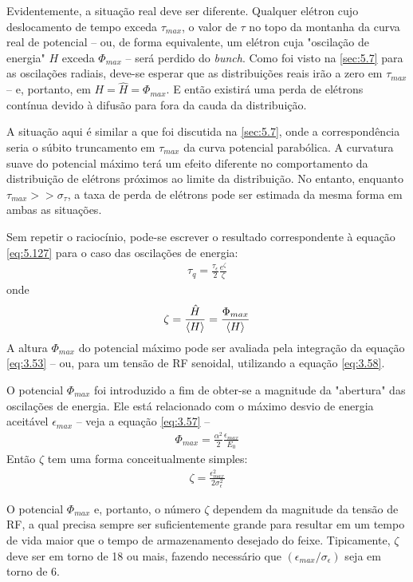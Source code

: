 Evidentemente, a situação real deve ser diferente. Qualquer elétron cujo deslocamento de tempo exceda $\tau_{max}$, o valor de $\tau$ no topo da montanha da curva real de potencial -- ou, de forma equivalente, um elétron cuja "oscilação de energia" $H$ exceda $\Phi_{max}$ -- será perdido do \textit{bunch}. Como foi visto na \autoref{sec:5.7} para as oscilações radiais, deve-se esperar que as distribuições reais irão a zero em $\tau_{max}$ -- e, portanto, em $H = \hat{H} = \Phi_{max}$. E então existirá uma perda de elétrons contínua devido à difusão para fora da cauda da distribuição.

A situação aqui é similar a que foi discutida na \autoref{sec:5.7}, onde a correspondência seria o súbito truncamento em $\tau_{max}$ da curva potencial parabólica. A curvatura suave do potencial máximo terá um efeito diferente no comportamento da distribuição de elétrons próximos ao limite da distribuição. No entanto, enquanto $\tau_{max} >> \sigma_\tau$, a taxa de perda de elétrons pode ser estimada da mesma forma em ambas as situações.

Sem repetir o raciocínio, pode-se escrever o resultado correspondente à equação \eqref{eq:5.127} para o caso das oscilações de energia:
\begin{align}
	\tau_q = \frac{\tau_\epsilon}{2}\frac{e^{\zeta}}{\zeta}
\end{align}
onde
\begin{align}
	\zeta = \frac{\hat{H}}{\left< H \right>} = \frac{\Phi_{max}}{\left< H \right>}
\end{align}
A altura $\Phi_{max}$ do potencial máximo pode ser avaliada pela integração da equação \eqref{eq:3.53} -- ou, para um tensão de RF senoidal, utilizando a equação \eqref{eq:3.58}.

O potencial $\Phi_{max}$ foi introduzido a fim de obter-se a magnitude da "abertura" das oscilações de energia. Ele está relacionado com o máximo desvio de energia aceitável $\epsilon_{max}$ -- veja a equação \eqref{eq:3.57} --
\begin{align}
	\Phi_{max} = \frac{\alpha^2}{2}\frac{\epsilon_{max}}{E_0}
\end{align}
Então $\zeta$ tem uma forma conceitualmente simples:
\begin{align}
	\zeta = \frac{\epsilon_{max}^2}{2 \sigma_\epsilon^2}
\end{align}

O potencial $\Phi_{max}$ e, portanto, o número $\zeta$ dependem da magnitude da tensão de RF, a qual precisa sempre ser suficientemente grande para resultar em um tempo de vida maior que o tempo de armazenamento desejado do feixe. Tipicamente, $\zeta$ deve ser em torno de 18 ou mais, fazendo necessário que $(\epsilon_{max}/\sigma_\epsilon)$ seja em torno de 6.

